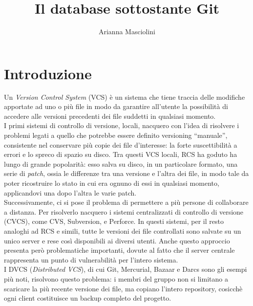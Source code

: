 \documentclass[12pt]{article}
\title{Il database sottostante Git}
\author{Arianna Masciolini}
\def\quote#1{``#1''}
\begin{document}
\maketitle
\newpage
\tableofcontents
\newpage
\section{Introduzione}
Un \textit{Version Control System} (VCS) è un sistema che tiene traccia delle modifiche apportate ad uno o più file in modo da garantire all'utente la possibilità di accedere alle versioni precedenti dei file suddetti in qualsiasi momento. 
\bigskip \\
I primi sistemi di controllo di versione, locali, nacquero con l'idea di risolvere i problemi legati a quello che potrebbe essere definito versioning \quote{manuale}, consistente nel conservare più copie dei file d'interesse: la forte suscettibilità a errori e lo spreco di spazio su disco. Tra questi VCS locali, RCS ha goduto ha lungo di grande popolarità: esso salva su disco, in un particolare formato, una serie di \textit{patch}, ossia le differenze tra una versione e l'altra dei file, in modo tale da poter ricostruire lo stato in cui era ognuno di essi in qualsiasi momento, applicandovi una dopo l'altra le varie patch.
\bigskip \\
Successivamente, ci si pose il problema di permettere a più persone di collaborare a distanza. Per risolverlo nacquero i sistemi centralizzati di controllo di versione (CVCS), come CVS, Subversion, e Perforce. In questi sistemi, per il resto analoghi ad RCS e simili, tutte le versioni dei file controllati sono salvate su un unico server e rese così disponibili ai diversi utenti. Anche questo approccio presenta però problematiche importanti, dovute al fatto che il server centrale rappresenta un punto di vulnerabilità per l'intero sistema. 
\bigskip \\
I DVCS (\textit{Distributed VCS}), di cui Git, Mercurial, Bazaar e Darcs sono gli esempi più noti, risolvono questo problema: i membri del gruppo non si limitano a scaricare la più recente versione dei file, ma copiano l'intero repository, cosicchè ogni client costituisce un backup completo del progetto.
\end{document}
